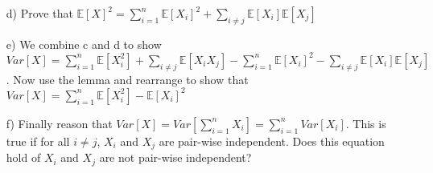 \documentclass[]{article}
\def \exx {\mathbb{E}}
\begin{document}
\begin{qunlist}
\begin{enumerate}
\qpart
\item[d)] Prove that $\exx[X]^2 = \sum\nolimits_{i=1}^n \exx[X_i]^2 + \sum\limits_{i \neq j} \exx[X_i] \exx[X_j]$
\qpart
\item[e)] We combine c and d to show $Var[X] = \sum\nolimits_{i=1}^n \exx[X_i^2] + \sum\limits_{i \neq j} \exx[X_iX_j] -  \sum\nolimits_{i=1}^n \exx[X_i]^2 - \sum\limits_{i \neq j} \exx[X_i] \exx[X_j]$. Now use the lemma and rearrange to show that $Var[X] = \sum\nolimits_{i=1}^n \exx[X_i^2] - \exx[X_i]^2$
\qpart
\item[f)] Finally reason that $Var[X] = Var[\sum\nolimits_{i=1}^n X_i] =    \sum\nolimits_{i=1}^n Var[X_i]$. This is true if for all $i \neq j$, $X_i$ and $X_j$ are pair-wise independent. Does this equation hold of $X_i$ and $X_j$ are not pair-wise independent?

\end{enumerate}
  

\end{qunlist}
\end{document}
